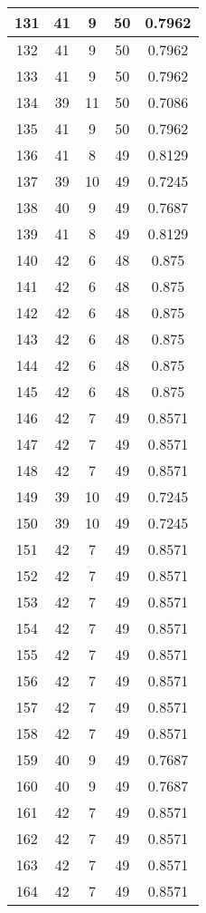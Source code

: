 \documentclass[letterpaper, 12pt]{article}
\begin{document}
\begin{longtable}{|c|c|c|c|c|}
\hline
131 & 41 & 9 & 50 & 0.7962 \\
\hline
132 & 41 & 9 & 50 & 0.7962 \\
\hline
133 & 41 & 9 & 50 & 0.7962 \\
\hline
134 & 39 & 11 & 50 & 0.7086 \\
\hline
135 & 41 & 9 & 50 & 0.7962 \\
\hline
136 & 41 & 8 & 49 & 0.8129 \\
\hline
137 & 39 & 10 & 49 & 0.7245 \\
\hline
138 & 40 & 9 & 49 & 0.7687 \\
\hline
139 & 41 & 8 & 49 & 0.8129 \\
\hline
140 & 42 & 6 & 48 & 0.875 \\
\hline
141 & 42 & 6 & 48 & 0.875 \\
\hline
142 & 42 & 6 & 48 & 0.875 \\
\hline
143 & 42 & 6 & 48 & 0.875 \\
\hline
144 & 42 & 6 & 48 & 0.875 \\
\hline
145 & 42 & 6 & 48 & 0.875 \\
\hline
146 & 42 & 7 & 49 & 0.8571 \\
\hline
147 & 42 & 7 & 49 & 0.8571 \\
\hline
148 & 42 & 7 & 49 & 0.8571 \\
\hline
149 & 39 & 10 & 49 & 0.7245 \\
\hline
150 & 39 & 10 & 49 & 0.7245 \\
\hline
151 & 42 & 7 & 49 & 0.8571 \\
\hline
152 & 42 & 7 & 49 & 0.8571 \\
\hline
153 & 42 & 7 & 49 & 0.8571 \\
\hline
154 & 42 & 7 & 49 & 0.8571 \\
\hline
155 & 42 & 7 & 49 & 0.8571 \\
\hline
156 & 42 & 7 & 49 & 0.8571 \\
\hline
157 & 42 & 7 & 49 & 0.8571 \\
\hline
158 & 42 & 7 & 49 & 0.8571 \\
\hline
159 & 40 & 9 & 49 & 0.7687 \\
\hline
160 & 40 & 9 & 49 & 0.7687 \\
\hline
161 & 42 & 7 & 49 & 0.8571 \\
\hline
162 & 42 & 7 & 49 & 0.8571 \\
\hline
163 & 42 & 7 & 49 & 0.8571 \\
\hline
164 & 42 & 7 & 49 & 0.8571 \\

\end{longtable}
\end{document}
